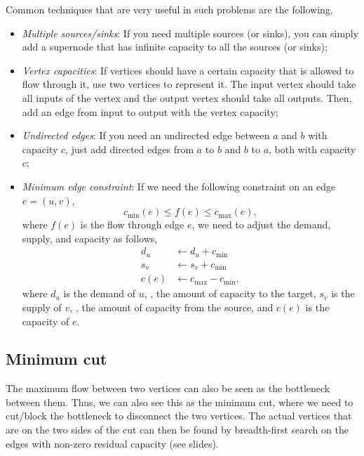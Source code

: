 \documentclass[justified,nobib]{tufte-handout}
\begin{document}
Common techniques that are very useful in such problems are the following,
\begin{itemize}
    \item \textit{Multiple sources/sinks}: If you need multiple sources (or
          sinks), you can simply add a supernode that has infinite capacity to all
          the sources (or sinks);
    \item \textit{Vertex capacities}: If vertices should have a certain capacity
          that is allowed to flow through it, use two vertices to represent it. The
          input vertex should take all inputs of the vertex and the output vertex
          should take all outputs. Then, add an edge from input to output with the
          vertex capacity;
    \item \textit{Undirected edges}: If you need an undirected edge between $a$
          and $b$ with capacity $c$, just add directed edges from $a$ to $b$ and $b$
          to $a$, both with capacity $c$;
    \item \textit{Minimum edge constraint}: If we need the following constraint
          on an edge $e=(u,v)$, \[
              c_{\min}(e) \leq f(e) \leq c_{\max}(e),
          \]
          where $f(e)$ is the flow through edge $e$, we need to adjust the demand, supply, and capacity as
          follows,
          \begin{align*}
              d_u  & \gets d_u + c_{\min}       \\
              s_v  & \gets s_v + c_{\min}       \\
              c(e) & \gets c_{\max} - c_{\min},
          \end{align*}
          where $d_u$ is the demand of $u$, \ie, the amount of capacity to the
          target, $s_v$ is the supply of $v$, \ie, the amount of capacity from the
          source, and $c(e)$ is the capacity of $e$.
\end{itemize}

\subsection{Minimum cut}

The maximum flow between two vertices can also be seen as the bottleneck between them. Thus, we can
also see this as the minimum cut, where we need to cut/block the bottleneck to disconnect the two
vertices. The actual vertices that are on the two sides of the cut can then be found by
breadth-first search on the edges with non-zero residual capacity (see slides).
\end{document}
